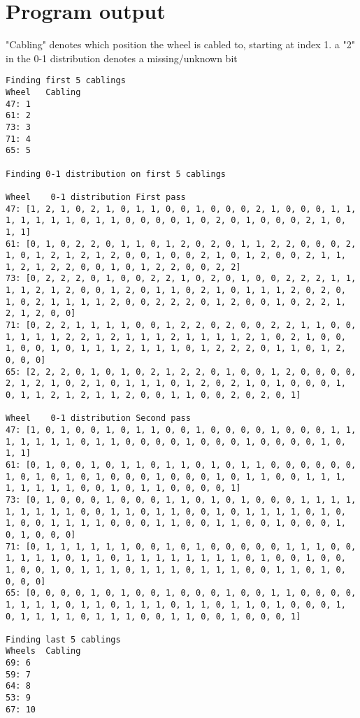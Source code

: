 \documentclass{article}
\begin{document}
\section*{Program output}

"Cabling" denotes which position the wheel is cabled to, starting at index 1. a "2" in the 0-1 distribution denotes a missing/unknown bit

\begin{verbatim}
Finding first 5 cablings
Wheel	Cabling
47:	1
61:	2
73:	3
71:	4
65:	5

Finding 0-1 distribution on first 5 cablings

Wheel	 0-1 distribution First pass
47:	[1, 2, 1, 0, 2, 1, 0, 1, 1, 0, 0, 1, 0, 0, 0, 2, 1, 0, 0, 0, 1, 1, 1, 1, 1, 1, 1, 0, 1, 1, 0, 0, 0, 0, 1, 0, 2, 0, 1, 0, 0, 0, 2, 1, 0, 1, 1]
61:	[0, 1, 0, 2, 2, 0, 1, 1, 0, 1, 2, 0, 2, 0, 1, 1, 2, 2, 0, 0, 0, 2, 1, 0, 1, 2, 1, 2, 1, 2, 0, 0, 1, 0, 0, 2, 1, 0, 1, 2, 0, 0, 2, 1, 1, 1, 2, 1, 2, 2, 0, 0, 1, 0, 1, 2, 2, 0, 0, 2, 2]
73:	[0, 2, 2, 2, 0, 1, 0, 0, 2, 2, 1, 0, 2, 0, 1, 0, 0, 2, 2, 2, 1, 1, 1, 1, 2, 1, 2, 0, 0, 1, 2, 0, 1, 1, 0, 2, 1, 0, 1, 1, 1, 2, 0, 2, 0, 1, 0, 2, 1, 1, 1, 1, 2, 0, 0, 2, 2, 2, 0, 1, 2, 0, 0, 1, 0, 2, 2, 1, 2, 1, 2, 0, 0]
71:	[0, 2, 2, 1, 1, 1, 1, 0, 0, 1, 2, 2, 0, 2, 0, 0, 2, 2, 1, 1, 0, 0, 1, 1, 1, 1, 2, 2, 1, 2, 1, 1, 1, 2, 1, 1, 1, 1, 2, 1, 0, 2, 1, 0, 0, 1, 0, 0, 1, 0, 1, 1, 1, 2, 1, 1, 1, 0, 1, 2, 2, 2, 0, 1, 1, 0, 1, 2, 0, 0, 0]
65:	[2, 2, 2, 0, 1, 0, 1, 0, 2, 1, 2, 2, 0, 1, 0, 0, 1, 2, 0, 0, 0, 0, 2, 1, 2, 1, 0, 2, 1, 0, 1, 1, 1, 0, 1, 2, 0, 2, 1, 0, 1, 0, 0, 0, 1, 0, 1, 1, 2, 1, 2, 1, 1, 2, 0, 0, 1, 1, 0, 0, 2, 0, 2, 0, 1]

Wheel	 0-1 distribution Second pass
47:	[1, 0, 1, 0, 0, 1, 0, 1, 1, 0, 0, 1, 0, 0, 0, 0, 1, 0, 0, 0, 1, 1, 1, 1, 1, 1, 1, 0, 1, 1, 0, 0, 0, 0, 1, 0, 0, 0, 1, 0, 0, 0, 0, 1, 0, 1, 1]
61:	[0, 1, 0, 0, 1, 0, 1, 1, 0, 1, 1, 0, 1, 0, 1, 1, 0, 0, 0, 0, 0, 0, 1, 0, 1, 0, 1, 0, 1, 0, 0, 0, 1, 0, 0, 0, 1, 0, 1, 1, 0, 0, 1, 1, 1, 1, 1, 1, 1, 1, 0, 0, 1, 0, 1, 1, 0, 0, 0, 0, 1]
73:	[0, 1, 0, 0, 0, 1, 0, 0, 0, 1, 1, 0, 1, 0, 1, 0, 0, 0, 1, 1, 1, 1, 1, 1, 1, 1, 1, 0, 0, 1, 1, 0, 1, 1, 0, 0, 1, 0, 1, 1, 1, 1, 0, 1, 0, 1, 0, 0, 1, 1, 1, 1, 0, 0, 0, 1, 1, 0, 0, 1, 1, 0, 0, 1, 0, 0, 0, 1, 0, 1, 0, 0, 0]
71:	[0, 1, 1, 1, 1, 1, 1, 0, 0, 1, 0, 1, 0, 0, 0, 0, 0, 1, 1, 1, 0, 0, 1, 1, 1, 1, 0, 1, 1, 0, 1, 1, 1, 1, 1, 1, 1, 1, 0, 1, 0, 0, 1, 0, 0, 1, 0, 0, 1, 0, 1, 1, 1, 0, 1, 1, 1, 0, 1, 1, 1, 0, 0, 1, 1, 0, 1, 0, 0, 0, 0]
65:	[0, 0, 0, 0, 1, 0, 1, 0, 0, 1, 0, 0, 0, 1, 0, 0, 1, 1, 0, 0, 0, 0, 1, 1, 1, 1, 0, 1, 1, 0, 1, 1, 1, 0, 1, 1, 0, 1, 1, 0, 1, 0, 0, 0, 1, 0, 1, 1, 1, 1, 0, 1, 1, 1, 0, 0, 1, 1, 0, 0, 1, 0, 0, 0, 1]

Finding last 5 cablings
Wheels	Cabling
69:	6
59:	7
64:	8
53:	9
67:	10
\end{verbatim}
\end{document}
